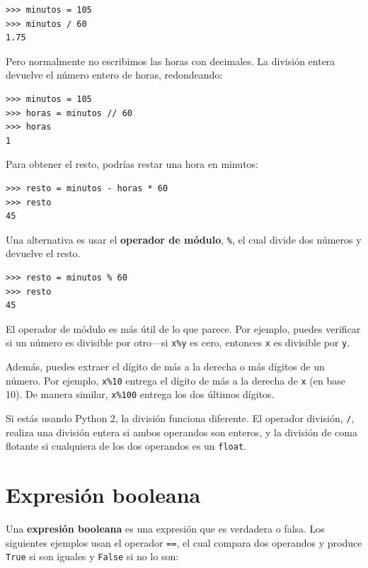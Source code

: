 \documentclass[10pt]{book}
\begin{document}
\begin{verbatim}
>>> minutos = 105
>>> minutos / 60
1.75
\end{verbatim}

Pero normalmente no escribimos las horas con decimales.  La división
entera devuelve el número entero de horas, redondeando:

\begin{verbatim}
>>> minutos = 105
>>> horas = minutos // 60
>>> horas
1
\end{verbatim}

Para obtener el resto, podrías restar una hora en minutos:

\begin{verbatim}
>>> resto = minutos - horas * 60
>>> resto
45
\end{verbatim}


Una alternativa es usar el {\bf operador de módulo}, \verb"%", el cual
divide dos números y devuelve el resto.

\begin{verbatim}
>>> resto = minutos % 60
>>> resto
45
\end{verbatim}
%
El operador de módulo es más útil de lo que parece.  Por
ejemplo, puedes verificar si un número es divisible por otro---si
{\tt x\%y} es cero, entonces {\tt x} es divisible por {\tt y}.

Además, puedes extraer el dígito de más a la derecha
o más dígitos de un número.  Por ejemplo, {\tt x\%10} entrega el
dígito de más a la derecha de {\tt x} (en base 10).  De manera similar, {\tt x\%100}
entrega los dos últimos dígitos.

Si estás usando Python 2, la división funciona diferente.  El
operador división, \verb"/", realiza una división entera si ambos
operandos son enteros, y la división de coma flotante si cualquiera de
los dos operandos es un {\tt float}.


\section{Expresión booleana}

Una {\bf expresión booleana} es una expresión que es verdadera
o falsa.  Los siguientes ejemplos usan el
operador {\tt ==}, el cual compara dos operandos y produce
{\tt True} si son iguales y {\tt False} si no lo son:
\end{document}
